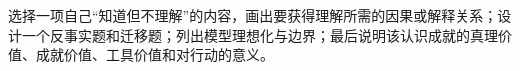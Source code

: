 \begin{tcolorbox}[breakable,colback=white,colframe=blue!30!black,title={本章研读任务},fonttitle=\bfseries]
选择一项自己“知道但不理解”的内容，画出要获得理解所需的因果或解释关系；设计一个反事实题和迁移题；列出模型理想化与边界；最后说明该认识成就的真理价值、成就价值、工具价值和对行动的意义。
\end{tcolorbox}
